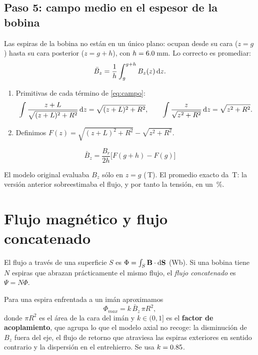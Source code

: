 \documentclass[11pt]{article}
\begin{document}
\subsection{Paso 5: campo medio en el espesor de la bobina}
Las espiras de la bobina no están en un único plano: ocupan desde su cara ($z=g$) hasta su cara posterior
($z=g+h$), con $h=6.0$\,mm. Lo correcto es promediar:
\[
  \bar B_z=\frac{1}{h}\int_g^{g+h}B_z(z)\,\mathrm{d} z .
\]
\begin{enumerate}
  \item Primitivas de cada término de \eqref{eq:campo}:
        \[
          \int\frac{z+L}{\sqrt{(z+L)^2+R^2}}\,\mathrm{d} z=\sqrt{(z+L)^2+R^2},\qquad
          \int\frac{z}{\sqrt{z^2+R^2}}\,\mathrm{d} z=\sqrt{z^2+R^2}.
        \]
  \item Definimos $F(z)=\sqrt{(z+L)^2+R^2}-\sqrt{z^2+R^2}$.
\end{enumerate}
\begin{resultado}
\begin{equation}
  \bar B_z=\frac{B_r}{2h}\Big[F(g+h)-F(g)\Big]
  \label{eq:campomedio}
\end{equation}
\end{resultado}
\begin{nota}
El modelo original evaluaba $B_z$ sólo en $z=g$ (\ValCampoCaraBobina\,T). El promedio exacto da
\ValCampoMedioBobina\,T: la versión anterior sobreestimaba el flujo, y por tanto la tensión, en un
\ValReduccionPorPromedio\,\%.
\end{nota}

\section{Flujo magnético y flujo concatenado}
El flujo a través de una superficie $S$ es $\Phi=\int_S\mathbf{B}\cdot\mathrm{d}\mathbf{S}$ (\si{\weber}). Si una bobina
tiene $N$ espiras que abrazan prácticamente el mismo flujo, el \emph{flujo concatenado} es $\Psi=N\Phi$.

Para una espira enfrentada a un imán aproximamos
\begin{equation}
  \Phi_{max}=k\,\bar B_z\,\pi R^2,
  \label{eq:flujo}
\end{equation}
donde $\pi R^2$ es el área de la cara del imán y $k\in(0,1]$ es el \textbf{factor de acoplamiento}, que agrupa
lo que el modelo axial no recoge: la disminución de $B_z$ fuera del eje, el flujo de retorno que atraviesa las
espiras exteriores en sentido contrario y la dispersión en el entrehierro. Se usa $k=0.85$.
\end{document}
